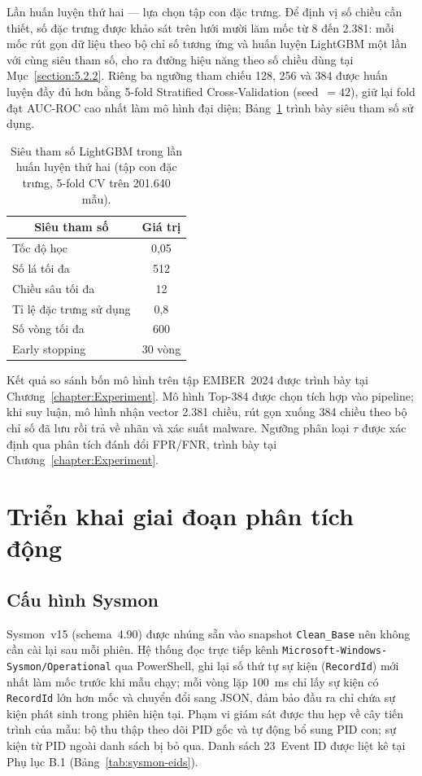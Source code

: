 \documentclass[../DoAn.tex]{subfiles}
\begin{document}
Lần huấn luyện thứ hai — lựa chọn tập con đặc trưng.
Để định vị số chiều cần thiết, số đặc trưng được khảo sát trên lưới
mười lăm mốc từ 8 đến 2.381: mỗi mốc rút gọn dữ liệu theo bộ chỉ số
tương ứng và huấn luyện LightGBM một lần với cùng siêu tham số, cho ra
đường hiệu năng theo số chiều dùng tại Mục~\ref{section:5.2.2}. Riêng
ba ngưỡng tham chiếu 128, 256 và 384 được huấn luyện đầy đủ hơn bằng
5-fold Stratified Cross-Validation (seed~$= 42$), giữ lại fold đạt
AUC-ROC cao nhất làm mô hình đại diện; Bảng~\ref{tab:domainmodel-params}
trình bày siêu tham số sử dụng.
\begin{table}[H]
\centering
\caption{Siêu tham số LightGBM trong lần huấn luyện thứ hai
  (tập con đặc trưng, 5-fold CV trên 201.640 mẫu).}
\label{tab:domainmodel-params}
\begin{tabular}{|l|c|}
\hline
\multicolumn{1}{|c|}{\textbf{Siêu tham số}} & \multicolumn{1}{c|}{\textbf{Giá trị}} \\
\hline
Tốc độ học               & 0{,}05 \\
\hline
Số lá tối đa             & 512 \\
\hline
Chiều sâu tối đa         & 12 \\
\hline
Tỉ lệ đặc trưng sử dụng & 0{,}8 \\
\hline
Số vòng tối đa           & 600 \\
\hline
Early stopping           & 30 vòng \\
\hline
\end{tabular}
\end{table}
Kết quả so sánh bốn mô hình trên tập EMBER~2024 được trình bày tại
Chương~\ref{chapter:Experiment}. Mô hình Top-384 được chọn tích hợp
vào pipeline; khi suy luận, mô hình nhận vector 2.381 chiều, rút gọn
xuống 384 chiều theo bộ chỉ số đã lưu rồi trả về nhãn và xác suất
malware. Ngưỡng phân loại $\tau$ được xác định qua phân tích đánh đổi
FPR/FNR, trình bày tại Chương~\ref{chapter:Experiment}.

\section{Triển khai giai đoạn phân tích động}
\label{section:4.3}

\subsection{Cấu hình Sysmon}
\label{section:4.3.1}

Sysmon~v15 (schema~4.90) được nhúng sẵn vào snapshot
\texttt{Clean\_Base} nên không cần cài lại sau mỗi phiên. Hệ
thống đọc trực tiếp kênh \texttt{Microsoft-Windows-Sysmon/Operational}
qua PowerShell, ghi lại số thứ tự sự kiện (\texttt{RecordId}) mới
nhất làm mốc trước khi mẫu chạy; mỗi vòng lặp 100~ms chỉ lấy sự
kiện có \texttt{RecordId} lớn hơn mốc và chuyển đổi sang JSON, đảm
bảo đầu ra chỉ chứa sự kiện phát sinh trong phiên hiện tại. Phạm vi
giám sát được thu hẹp về cây tiến trình của mẫu: bộ thu thập theo
dõi PID gốc và tự động bổ sung PID con; sự kiện từ PID ngoài danh
sách bị bỏ qua. Danh sách 23~Event ID được liệt kê tại Phụ lục B.1
(Bảng~\ref{tab:sysmon-eids}).
\end{document}
